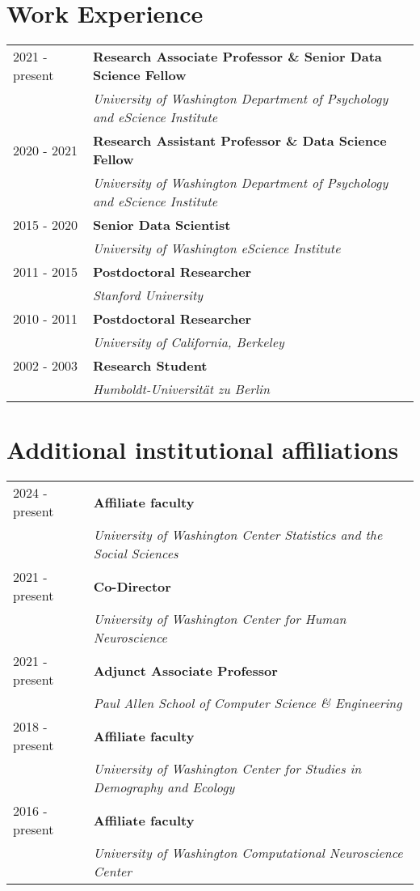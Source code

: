 \documentclass[11pt,fullpage]{article}
\begin{document}
\section*{Work Experience}
\begin{tabular}{ll}
  2021 -  present & {\bf Research Associate Professor \& Senior Data Science Fellow} \\ & \emph{University of Washington Department of Psychology and eScience Institute}\\
  2020 - 2021 & {\bf Research Assistant Professor \& Data Science Fellow} \\ & \emph{University of Washington Department of Psychology and eScience Institute}\\
  2015 - 2020 & {\bf Senior Data Scientist}\\ & \emph{University of Washington eScience Institute}\\
  2011 - 2015 & {\bf Postdoctoral Researcher}\\ & \emph{Stanford University}\\
  2010 - 2011 & {\bf Postdoctoral Researcher}\\ & \emph{University of California, Berkeley}\\
  2002 - 2003 & {\bf Research Student}\\ & \emph{Humboldt-Universit\"{a}t zu Berlin}\\
\end{tabular}


\section*{Additional institutional affiliations}
\begin{tabular}{ll}
  2024 - present & {\bf Affiliate faculty } \\ & \emph{University of Washington Center Statistics and the Social Sciences} \\
  2021 - present & {\bf Co-Director} \\ & \emph{University of Washington Center for Human Neuroscience} \\
  2021 - present & {\bf Adjunct Associate Professor} \\ & \emph{Paul Allen School of Computer Science \& Engineering} \\
  2018 - present & {\bf Affiliate faculty } \\ & \emph{University of Washington Center for Studies in Demography and Ecology} \\
  2016 - present & {\bf Affiliate faculty } \\ & \emph{University of Washington Computational Neuroscience Center} \\
\end{tabular}
\end{document}
